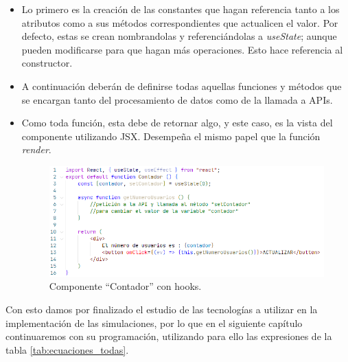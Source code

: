\documentclass[../main.tex]{subfiles}
\begin{document}
    \begin{itemize}
        \item Lo primero es la creación de las constantes que hagan referencia tanto a los atributos como a sus métodos correspondientes que actualicen el valor. Por defecto, estas se crean nombrandolas y referenciándolas a \textit{useState}; aunque pueden modificarse para que hagan más operaciones. Esto hace referencia al constructor.
        
        \item A continuación deberán de definirse todas aquellas funciones y métodos que se encargan tanto del procesamiento de datos como de la llamada a APIs. 
        
        \item Como toda función, esta debe de retornar algo, y este caso, es la vista del componente utilizando JSX. Desempeña el mismo papel que la función \textit{render}. \\
        
        \begin{figure}[!h]
            \centering
            \includegraphics[width=\textwidth]{images/componente_estructura_hook.PNG}
            \caption{Componente ``Contador'' con hooks.}
            \label{fig::estructura_contador_hooks}
        \end{figure}
        
    \end{itemize}
    
    Con esto damos por finalizado el estudio de las tecnologías a utilizar en la implementación de las simulaciones, por lo que en el siguiente capítulo continuaremos con su programación, utilizando para ello las expresiones de la tabla \ref{tab:ecuaciones_todas}.\\
\end{document}

